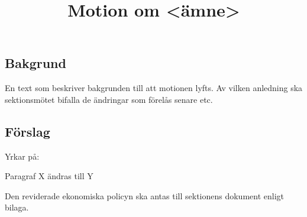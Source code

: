 \documentclass[11pt, noincludeaddress, nopagination]{classes/cthit}
\begin{document}
\title{Motion om <ämne>}

\makeheadfoot%

\makesimpletitle

\subsection*{Bakgrund}
En text som beskriver bakgrunden till att motionen lyfts. Av vilken anledning ska sektionsmötet bifalla de ändringar som förelås senare etc.

\subsection*{Förslag}
Yrkar på:
\begin{att}
	\item Paragraf X ändras till Y
	\item Den reviderade ekonomiska policyn ska antas till sektionens dokument enligt bilaga.
\end{att}
\end{document}

